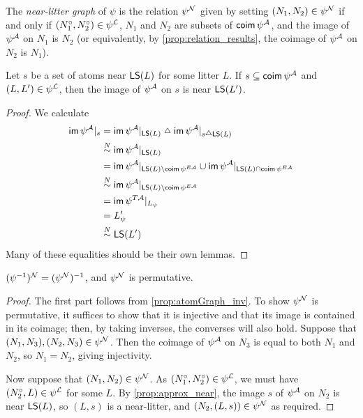 \begin{definition}
  \label{def:nearLitterGraph}
  The \emph{near-litter graph} of \( \psi \) is the relation \( \psi^{\mathcal N} \) given by setting \( (N_1, N_2) \in \psi^{\mathcal N} \) if and only if \( (N_1^\circ, N_2^\circ) \in \psi^{\mathcal L} \), \( N_1 \) and \( N_2 \) are subsets of \( \operatorname{\mathsf{coim}} \psi^{\mathcal A} \), and the image of \( \psi^{\mathcal A} \) on \( N_1 \) is \( N_2 \) (or equivalently, by \cref{prop:relation_results}, the coimage of \( \psi^{\mathcal A} \) on \( N_2 \) is \( N_1 \)).
\end{definition}
\begin{proposition}
  \label{prop:approx_near}
  Let \( s \) be a set of atoms near \( \operatorname{\mathsf{LS}}(L) \) for some litter \( L \).
  If \( s \subseteq \operatorname{\mathsf{coim}} \psi^{\mathcal A} \) and \( (L, L') \in \psi^{\mathcal L} \), then the image of \( \psi^{\mathcal A} \) on \( s \) is near \( \operatorname{\mathsf{LS}}(L') \).
\end{proposition}
\begin{proof}
  We calculate
  \begin{align*}
    \im \psi^\Atom|_s
    &= \im \psi^\Atom|_{\LS(L)} \symmdiff \im \psi^\Atom|_{s \symmdiff \LS(L)} \\
    &\near \im \psi^\Atom|_{\LS(L)} \\
    &= \im \psi^\Atom|_{\LS(L) \setminus \coim \psi^{E\Atom}} \cup \im \psi^\Atom|_{\LS(L) \cap \coim \psi^{E\Atom}} \\
    &\near \im \psi^\Atom|_{\LS(L) \setminus \coim \psi^{E\Atom}} \\
    &= \im \psi^{T\Atom}|_{L_\psi} \\
    &= L'_\psi \\
    &\near \LS(L')
  \end{align*}
  Many of these equalities should be their own lemmas.
\end{proof}
\begin{proposition}
  \label{prop:nearLitterGraph_permutative}
  \( (\psi^{-1})^{\mathcal N} = (\psi^{\mathcal N})^{-1} \), and \( \psi^{\mathcal N} \) is permutative.
\end{proposition}
\begin{proof}
  The first part follows from \cref{prop:atomGraph_inv}.
  To show \( \psi^{\mathcal N} \) is permutative, it suffices to show that it is injective and that its image is contained in its coimage; then, by taking inverses, the converses will also hold.
  Suppose that \( (N_1, N_3), (N_2, N_3) \in \psi^{\mathcal N} \).
  Then the coimage of \( \psi^{\mathcal A} \) on \( N_3 \) is equal to both \( N_1 \) and \( N_2 \), so \( N_1 = N_2 \), giving injectivity.

  Now suppose that \( (N_1, N_2) \in \psi^{\mathcal N} \).
  As \( (N_1^\circ, N_2^\circ) \in \psi^{\mathcal L} \), we must have \( (N_2^\circ, L) \in \psi^{\mathcal L} \) for some \( L \).
  By \cref{prop:approx_near}, the image \( s \) of \( \psi^{\mathcal A} \) on \( N_2 \) is near \( \operatorname{\mathsf{LS}}(L) \), so \( (L, s) \) is a near-litter, and \( (N_2, (L, s)) \in \psi^{\mathcal N} \) as required.
\end{proof}
